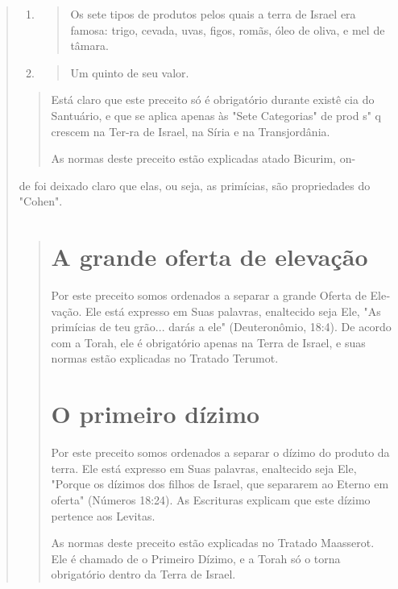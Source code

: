 \begin{quote}
\begin{enumerate}
\def\labelenumi{\arabic{enumi}.}
\setcounter{enumi}{165}
\item
 \begin{quote}
 Os sete tipos de produtos pelos quais a terra de Israel era famosa:
 trigo, cevada, uvas, figos, romãs, óleo de oliva, e mel de tâmara.
 \end{quote}
\item
 \begin{quote}
 Um quinto de seu valor.
 \end{quote}
\end{enumerate}

\begin{quote}


Está claro que este preceito só é obrigatório durante existê cia do
Santuário, e que se aplica apenas às "Sete Categorias" de prod s" q
crescem na Ter-ra de Israel, na Síria e na Transjordânia.

As normas deste preceito estão explicadas atado Bicurim, on-
\end{quote}

de foi deixado claro que elas, ou seja, as primícias, são propriedades
do "Cohen".

\begin{quote}
\section{A grande oferta de elevação}

Por este preceito somos ordenados a separar a grande Oferta de
Ele­vação. Ele está expresso em Suas palavras, enaltecido seja Ele, "As
primícias de teu grão... darás a ele" (Deuteronômio, 18:4). De acordo
com a Torah, ele é obrigatório apenas na Terra de Israel, e suas normas
estão explicadas no Tra­tado Terumot.

\section{O primeiro dízimo}

Por este preceito somos ordenados a separar o dízimo do produto da
terra. Ele está expresso em Suas palavras, enaltecido seja Ele, "Porque
os dízimos dos filhos de Israel, que separarem ao Eterno em oferta"
(Números 18:24). As Escrituras explicam que este dízimo pertence aos
Levitas.

As normas deste preceito estão explicadas no Tratado Maasserot. Ele é
chamado de o Primeiro Dízimo, e a Torah só o torna obrigatório dentro da
Terra de Israel.


\end{quote}
\end{quote}
